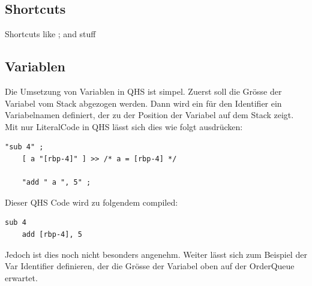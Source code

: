 \subsection{Shortcuts}
Shortcuts like ; and stuff

\subsection{Variablen}
Die Umsetzung von Variablen in QHS ist simpel. Zuerst soll die Grösse der Variabel vom Stack abgezogen werden. Dann wird ein für den Identifier ein Variabelnamen definiert, der zu der Position der Variabel auf dem Stack zeigt.
Mit nur LiteralCode in QHS lässt sich dies wie folgt ausdrücken:

\begin{lstlisting}[language=QHS, label=eg:qhs-var-literal, caption=THING]
    "sub 4" ;
    [ a "[rbp-4]" ] >> /* a = [rbp-4] */

    "add " a ", 5" ;
\end{lstlisting}

Dieser QHS Code wird zu folgendem compiled:

\begin{lstlisting}[label=eg:qhs-var-literal-compiled, caption=THING]
    sub 4
    add [rbp-4], 5
\end{lstlisting}

Jedoch ist dies noch nicht besonders angenehm. Weiter lässt sich zum Beispiel der Var Identifier definieren, der die Grösse der Variabel oben auf der OrderQueue erwartet. 




